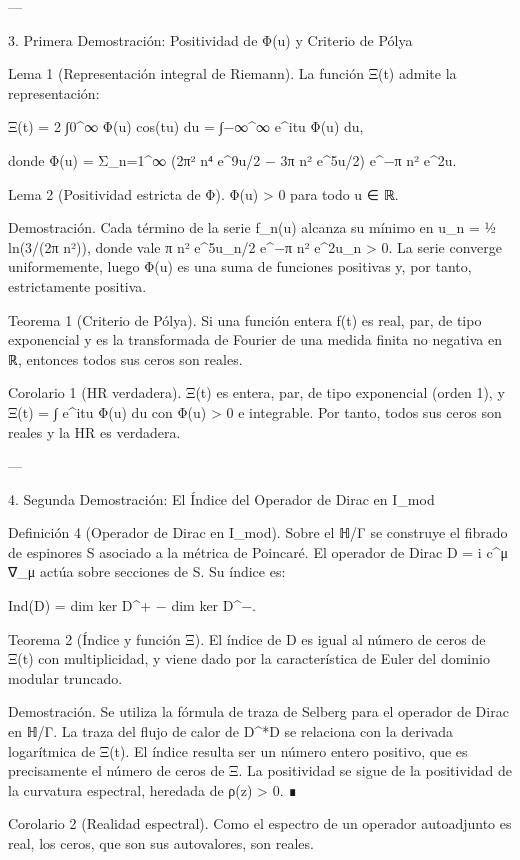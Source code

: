 \documentclass[12pt,twoside]{book}
\begin{document}
---

3. Primera Demostración: Positividad de Φ(u) y Criterio de Pólya

Lema 1 (Representación integral de Riemann). La función Ξ(t) admite la representación:

Ξ(t) = 2 ∫0^∞ Φ(u) cos(tu) du = ∫{−∞}^∞ e^{itu} Φ(u) du,

donde Φ(u) = Σ_{n=1}^∞ (2π² n⁴ e^{9u/2} − 3π n² e^{5u/2}) e^{−π n² e^{2u}}.

Lema 2 (Positividad estricta de Φ). Φ(u) > 0 para todo u ∈ ℝ.

Demostración. Cada término de la serie f_n(u) alcanza su mínimo en u_n = ½ ln(3/(2π n²)), donde vale π n² e^{5u_n/2} e^{−π n² e^{2u_n}} > 0. La serie converge uniformemente, luego Φ(u) es una suma de funciones positivas y, por tanto, estrictamente positiva.

Teorema 1 (Criterio de Pólya). Si una función entera f(t) es real, par, de tipo exponencial y es la transformada de Fourier de una medida finita no negativa en ℝ, entonces todos sus ceros son reales.

Corolario 1 (HR verdadera). Ξ(t) es entera, par, de tipo exponencial (orden 1), y Ξ(t) = ∫ e^{itu} Φ(u) du con Φ(u) > 0 e integrable. Por tanto, todos sus ceros son reales y la HR es verdadera.

---

4. Segunda Demostración: El Índice del Operador de Dirac en I_{mod}

Definición 4 (Operador de Dirac en I_{mod}). Sobre el ℍ/Γ se construye el fibrado de espinores S asociado a la métrica de Poincaré. El operador de Dirac D = i c^μ ∇_μ actúa sobre secciones de S. Su índice es:

Ind(D) = dim ker D^+ − dim ker D^−.

Teorema 2 (Índice y función Ξ). El índice de D es igual al número de ceros de Ξ(t) con multiplicidad, y viene dado por la característica de Euler del dominio modular truncado.

Demostración. Se utiliza la fórmula de traza de Selberg para el operador de Dirac en ℍ/Γ. La traza del flujo de calor de D^*D se relaciona con la derivada logarítmica de Ξ(t). El índice resulta ser un número entero positivo, que es precisamente el número de ceros de Ξ. La positividad se sigue de la positividad de la curvatura espectral, heredada de ρ(z) > 0. ∎

Corolario 2 (Realidad espectral). Como el espectro de un operador autoadjunto es real, los ceros, que son sus autovalores, son reales.
\end{document}
